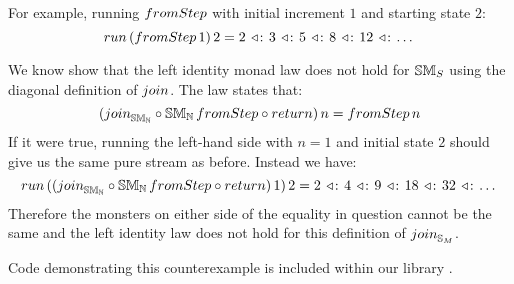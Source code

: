 For example, running $\fromstepstr$ with initial increment $1$ and starting state $2$:
$$
\strun\,(\fromstepstr\, 1)\, 2 = 2\, \acons\, 3\, \acons\, 5\, \acons\, 8\, \acons\, 12\, \acons\, \dots
$$

We know show that the left identity monad law does not hold for $\mathbb{SM}_{S}$ using the diagonal definition of $\join$.
The law states that:
$$
(\join_{\stmon{\nat}} \comp \stmon{\nat}\, \fromstepstr \comp \return)\, n = \fromstepstr\, n
$$
If it were true, running the left-hand side with $n = 1$ and initial state $2$ should give us the same pure stream as before.
Instead we have:
$$
\strun\, ((\join_{\stmon{\nat}} \comp \stmon{\nat}\, \fromstepstr \comp \return)\, 1)\, 2 = 2\, \acons\, 4\, \acons\, 9\, \acons\, 18\, \acons\, 32\, \acons\, \dots
$$
Therefore the monsters on either side of the equality in question cannot be the same and the left identity law does not hold for this definition of $\join_{\stream{M}}$.

Code demonstrating this counterexample is included within our library . 




